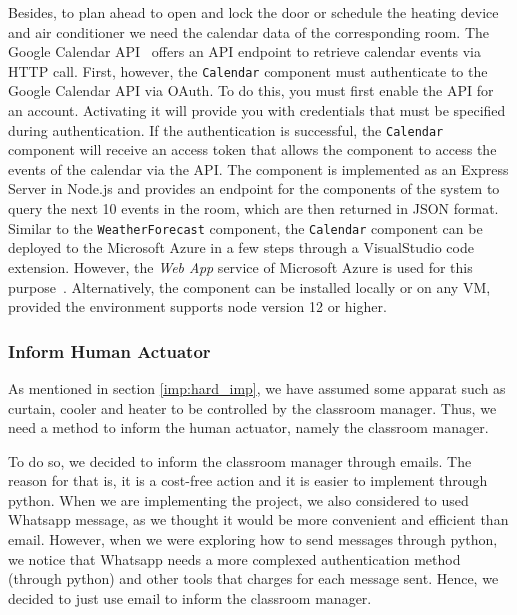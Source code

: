 \documentclass[runningheads]{llncs}
\begin{document}
Besides, to plan ahead to open and lock the door or schedule the heating device and air conditioner we need the calendar data of the corresponding room. 
The Google Calendar API~\cite{APIRefer59:online} offers an API endpoint to retrieve calendar events via HTTP call.
First, however, the \texttt{Calendar} component must authenticate to the Google Calendar API via OAuth.
To do this, you must first enable the API for an account.
Activating it will provide you with credentials that must be specified during authentication.
If the authentication is successful, the \texttt{Calendar} component will receive an access token that allows the component to access the events of the calendar via the API. 
The component is implemented as an Express Server in Node.js and provides an endpoint for the components of the system to query the next 10 events in the room, which are then returned in JSON format.
Similar to the \texttt{WeatherForecast} component, the \texttt{Calendar} component can be deployed to the Microsoft Azure in a few steps through a VisualStudio code extension.
However, the \textit{Web App} service of Microsoft Azure is used for this purpose~\cite{WebAppDi86:online}.
Alternatively, the component can be installed locally or on any VM, provided the environment supports node version 12 or higher.

\subsubsection{Inform Human Actuator}\hfill
\label{soft_imp:actuator}
\newline
As mentioned in section \ref{imp:hard_imp}, we have assumed some apparat such as curtain, cooler and heater to be controlled by the classroom manager. Thus, we need a method to inform the human actuator, namely the classroom manager.

To do so, we decided to inform the classroom manager through emails. The reason for that is, it is a cost-free action and it is easier to implement through python. When we are implementing the project, we also considered to used Whatsapp message, as we thought it would be more convenient and efficient than email. However, when we were exploring how to send messages through python, we notice that Whatsapp needs a more complexed authentication method (through python) and other tools that charges for each message sent. Hence, we decided to just use email to inform the classroom manager.\\
\end{document}
